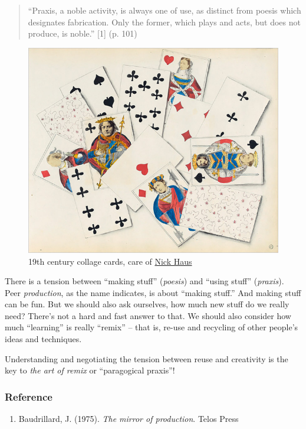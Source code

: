 \begin{quote}
``Praxis, a noble activity, is always one of use, as distinct from
poesis which designates fabrication. Only the former, which plays and
acts, but does not produce, is noble.'' {[}1{]} (p. 101)
\end{quote}
\begin{figure}
\centering
\includegraphics[width=\textwidth]{../pictures/collage.jpg}
\caption*{19th century collage cards, care of
  \href{http://www.nickhaus.com/2010/02/afternoon-remembered-complete-with.html}{Nick
    Haus}}
\end{figure}


There is a tension between ``making stuff'' (\emph{poesis}) and ``using
stuff'' (\emph{praxis}). Peer \emph{production}, as the name indicates,
is about ``making stuff.'' And making stuff can be fun. But we should
also ask ourselves, how much new stuff do we really need? There's not a
hard and fast answer to that. We should also consider how much
``learning'' is really ``remix'' -- that is, re-use and recycling of
other people's ideas and techniques.

Understanding and negotiating the tension between reuse and creativity
is the key to \emph{the art of remix} or ``paragogical praxis''!

\subsubsection{Reference}

\begin{enumerate}
\item
  Baudrillard, J. (1975). \emph{The mirror of production}. Telos Press
\end{enumerate}
